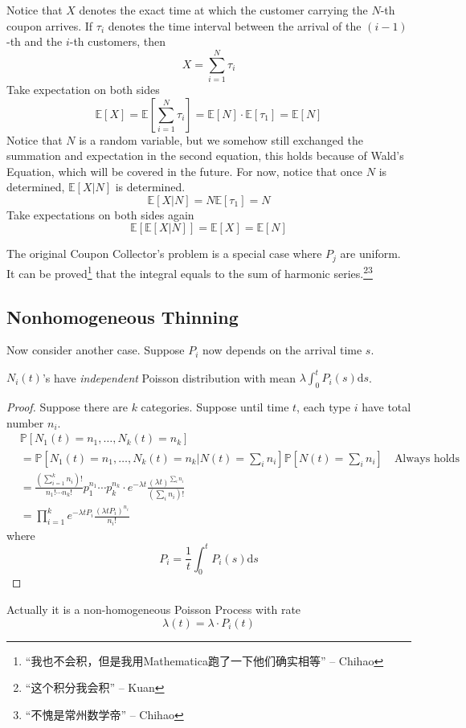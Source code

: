         Notice that $X$ denotes the exact time at which the customer carrying the $N$-th coupon arrives. If $\tau_i$ denotes the time interval between the arrival of the $(i-1)$-th and the $i$-th customers, then
        \[ X = \sum_{i=1}^N \tau_i \]
        Take expectation on both sides
        \[ \mathbb{E}[X] = \mathbb{E}\left[ \sum_{i=1}^N \tau_i \right] = \mathbb{E}[N]\cdot\mathbb{E}[\tau_1] = \mathbb{E}[N] \]
        Notice that $N$ is a random variable, but we somehow still exchanged the summation and expectation in the second equation, this holds because of Wald's Equation, which will be covered in the future. For now, notice that once $N$ is determined, $\mathbb{E}[X|N]$ is determined.
        \[ \mathbb{E}[X|N] = N\mathbb{E}[\tau_1] = N \]
        Take expectations on both sides again
        \[ \mathbb{E}[\mathbb{E}[X|N]] = \mathbb{E}[X] = \mathbb{E}[N] \]
        \begin{remark}
            The original Coupon Collector's problem is a special case where $P_j$ are uniform. It can be proved\footnote{“我也不会积，但是我用Mathematica跑了一下他们确实相等” -- Chihao} that the integral equals to the sum of harmonic series.\footnote{“这个积分我会积” -- Kuan}\footnote{“不愧是常州数学帝” -- Chihao}
        \end{remark}

    \subsection{Nonhomogeneous Thinning}
        Now consider another case. Suppose $P_i$ now depends on the arrival time $s$.
        \begin{theorem}
            \label{Thm:NonhomogeneousThinning}
            $N_i(t)$'s have \emph{independent} Poisson distribution with mean $\lambda\int_0^t P_i(s)\mathrm{d}s$.
        \end{theorem}
        \begin{proof}
            Suppose there are $k$ categories. Suppose until time $t$, each type $i$ have total number $n_i$.
            \begin{align*}
                &\mathbb{P}[N_1(t)=n_1,\dots,N_k(t)=n_k]\\
                &=\mathbb{P}\left[ N_1(t)=n_1,\dots,N_k(t)=n_k|N(t)=\sum_i n_i \right]\mathbb{P}\left[ N(t) = \sum_i n_i \right] \quad \text{Always holds}\\
                &= \frac{\left(\sum_{i=1}^kn_i\right)!}{n_1!\cdots n_k!}p_1^{n_1}\cdots p_k^{n_k} \cdot e^{-\lambda t}\frac{(\lambda t)^{\sum_in_i}}{(\sum_i n_i)!}\\
                &= \prod_{i=1}^k e^{-\lambda t P_i} \frac{(\lambda t P_i)^{n_i}}{n_i!}
            \end{align*}
            where
            \[ P_i = \frac{1}{t}\int_0^t P_i(s)\mathrm{d}s \]
        \end{proof}
        \begin{remark}
            Actually it is a non-homogeneous Poisson Process with rate
            \[ \lambda(t) = \lambda\cdot P_i(t) \]
        \end{remark}

